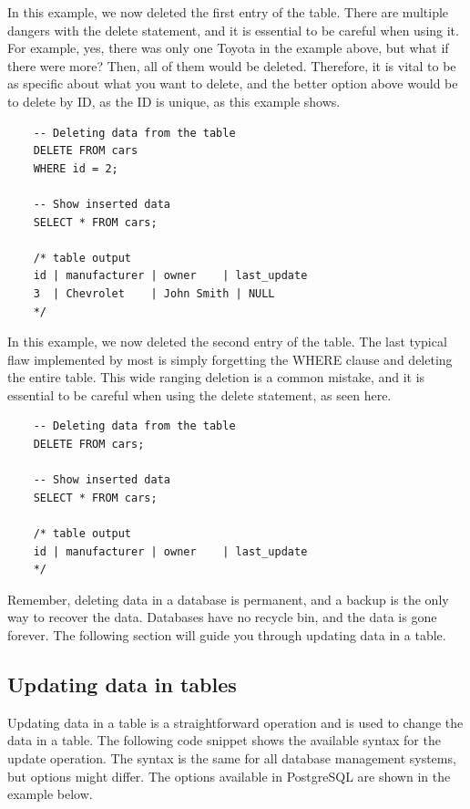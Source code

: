 In this example, we now deleted the first entry of the table. There are multiple dangers with the delete statement, and it is essential to be careful when using it. For example, yes, there was only one Toyota in the example above, but what if there were more? Then, all of them would be deleted. Therefore, it is vital to be as specific about what you want to delete, and the better option above would be to delete by ID, as the ID is unique, as this example shows.

\begin{verbatim}
    -- Deleting data from the table
    DELETE FROM cars
    WHERE id = 2;

    -- Show inserted data
    SELECT * FROM cars;

    /* table output
    id | manufacturer | owner    | last_update
    3  | Chevrolet    | John Smith | NULL
    */
\end{verbatim}

In this example, we now deleted the second entry of the table. The last typical flaw implemented by most is simply forgetting the WHERE clause and deleting the entire table. This wide ranging deletion is a common mistake, and it is essential to be careful when using the delete statement, as seen here.

\begin{verbatim}
    -- Deleting data from the table
    DELETE FROM cars;

    -- Show inserted data
    SELECT * FROM cars;

    /* table output
    id | manufacturer | owner    | last_update
    */
\end{verbatim}

Remember, deleting data in a database is permanent, and a backup is the only way to recover the data. Databases have no recycle bin, and the data is gone forever. The following section will guide you through updating data in a table.

\subsection{Updating data in tables}
Updating data in a table is a straightforward operation and is used to change the data in a table. The following code snippet shows the available syntax for the update operation. The syntax is the same for all database management systems, but options might differ. The options available in PostgreSQL are shown in the example below.


